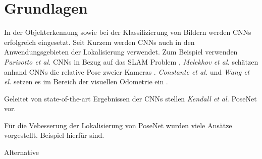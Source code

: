 \pagebreak
\section{Grundlagen}





\pagebreak
In der Objekterkennung \cite{girshickRichFeatureHierarchies2013, girshickFastRCNN2015} sowie bei der Klassifizierung von Bildern \cite{krizhevskyImageNetClassificationDeep2012, heDeepResidualLearning2015} werden CNNs erfolgreich eingesetzt.
Seit Kurzem werden CNNs auch in den Anwendungsgebieten der Lokalisierung verwendet. Zum Beispiel verwenden \textit{Parisotto et al.} CNNs in Bezug auf das SLAM Problem \cite{parisottoGlobalPoseEstimation2018}, \textit{Melekhov et al.} schätzen anhand CNNs die relative Pose zweier Kameras \cite{melekwashovRelativeCameraPose2017}. \textit{Constante et al.} und \textit{Wang et el.} setzen es im Bereich der visuellen Odometrie ein \cite{costanteExploringRepresentationLearning2016, wangDeepVOEndtoendVisual2017}.

Geleitet von state-of-the-art Ergebnissen der CNNs stellen \textit{Kendall et al.} PoseNet vor.

Für die Vebesserung der Lokalisierung von PoseNet wurden viele Ansätze vorgestellt. Beispiel hierfür sind.



Alternative 


% 
